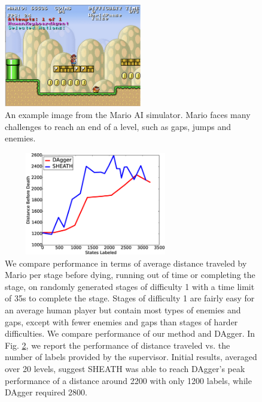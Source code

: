 \documentclass[10pt, conference]{ieeeconf}      %
\begin{document}
\begin{figure}[t!]
\centering
\includegraphics[width = 6cm ]{figures/mario.png}
\caption{ An example image from the Mario AI simulator. Mario faces many challenges to reach an end of a level, such as gaps, jumps and enemies.  }

\vspace*{-10pt}
\label{fig:dis_traveled}
\end{figure}



\begin{figure}[ht]
\centering

\includegraphics[width=8cm, height = 4.5cm]{figures/dagger_sheath_mario.eps}


\caption{We compare performance in terms of average distance traveled by Mario per stage before dying, running out of time or completing the stage, on randomly generated stages of difficulty 1 with a time limit of 35s to complete the stage.  Stages of difficulty 1 are fairly easy for an average human player but contain most types of enemies and gaps, except with fewer enemies and gaps than stages of harder difficulties. We compare performance of our method and DAgger. In Fig. \ref{fig:mario_results}, we report the performance of distance traveled vs. the number of labels provided by the supervisor. Initial results, averaged over 20 levels, suggest SHEATH was able to reach DAgger's peak performance of a distance around 2200 with only 1200 labels, while DAgger required 2800.   }
\label{fig:mario_results}
\end{figure}
\end{document}
